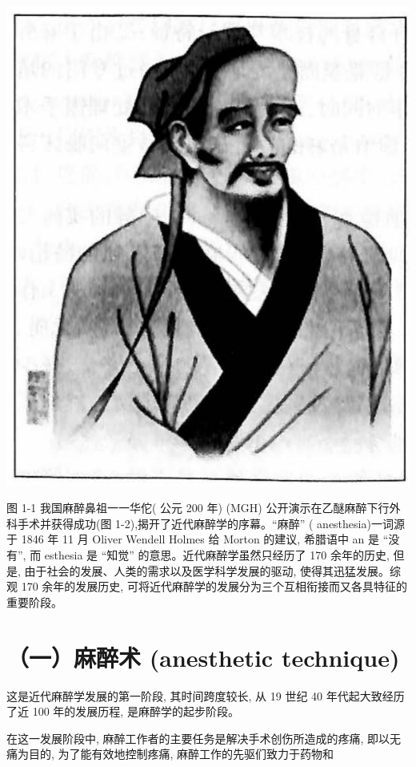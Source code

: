 \documentclass[10pt]{article}
\begin{document}
\begin{center}
\includegraphics[max width=\textwidth]{2024_07_09_002a177993bd97d1d6d7g-026}
\end{center}

图 1-1 我国麻醉鼻祖一一华佗( 公元 200 年) (MGH) 公开演示在乙醚麻醉下行外科手术并获得成功(图 1-2),揭开了近代麻醉学的序幕。“麻醉” ( anesthesia)一词源于 1846 年 11 月 Oliver Wendell Holmes 给 Morton 的建议, 希腊语中 an 是 “没有”, 而 esthesia 是 “知觉” 的意思。近代麻醉学虽然只经历了 170 余年的历史, 但是, 由于社会的发展、人类的需求以及医学科学发展的驱动, 使得其迅猛发展。综观 170 余年的发展历史, 可将近代麻醉学的发展分为三个互相衔接而又各具特征的重要阶段。

\section*{（一）麻醉术 (anesthetic technique)}
这是近代麻醉学发展的第一阶段, 其时间跨度较长, 从 19 世纪 40 年代起大致经历了近 100 年的发展历程, 是麻醉学的起步阶段。

在这一发展阶段中, 麻醉工作者的主要任务是解决手术创伤所造成的疼痛, 即以无痛为目的, 为了能有效地控制疼痛, 麻醉工作的先驱们致力于药物和
\end{document}

